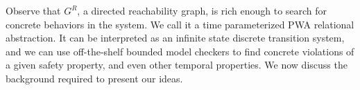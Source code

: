 Observe that $G^R$, a directed reachability graph, is rich enough to
search for concrete behaviors in the system. We call it a time
parameterized PWA relational abstraction. It can be interpreted as an
infinite state discrete transition system, and we can use
off-the-shelf bounded model checkers to find concrete violations of a
given safety property, and even other temporal properties.  We now
discuss the background required to present our ideas.


